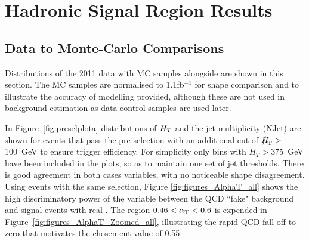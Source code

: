 \section{Hadronic Signal Region Results}
\subsection{Data to Monte-Carlo Comparisons }

Distributions of the 2011 data with MC samples alongside are shown in this section. The MC samples are normalised to 1.1fb$^{-1}$ for shape comparison and to illustrate the accuracy of modelling provided, although these are not used in background estimation as data control samples are used later.

In Figure~\ref{fig:preselplota} distributions of $H_{T} $ and the jet multiplicity (NJet) are shown for events that pass the pre-selection with an additional cut of $\MHT >$ 100~GeV to ensure trigger efficiency. For simplicity only bins with $H_{T} > $375~GeV have been included in the plots, so as to maintain one set of jet thresholds. There is good agreement in both cases variables, with no noticeable shape disagreement. Using events with the same selection, Figure \ref{fig:figures_AlphaT_all} shows the high discriminatory power of the \alt variable between the QCD ``fake" \MET background and signal events with real \MET. The region $0.46 < \alpha_{\text{T}} < 0.6$ is expended in Figure~\ref{fig:figures_AlphaT_Zoomed_all}, illustrating the rapid QCD fall-off to zero that motivates the chosen cut value of 0.55.

